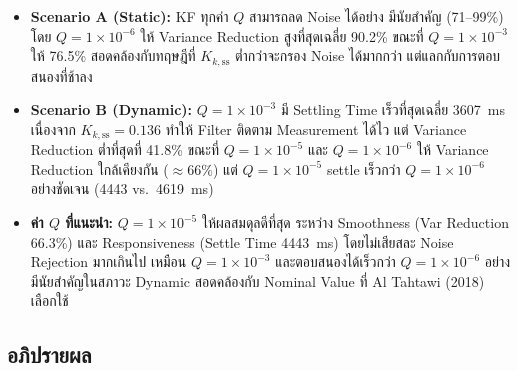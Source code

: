 \begin{itemize}
    \item \textbf{Scenario A (Static):} KF ทุกค่า $Q$ สามารถลด Noise ได้อย่าง
          มีนัยสำคัญ (71--99\%) โดย $Q = 1\times10^{-6}$ ให้ Variance Reduction
          สูงที่สุดเฉลี่ย 90.2\% ขณะที่ $Q = 1\times10^{-3}$ ให้ 76.5\%
          สอดคล้องกับทฤษฎีที่ $K_{k,\mathrm{ss}}$ ต่ำกว่าจะกรอง Noise ได้มากกว่า
          แต่แลกกับการตอบสนองที่ช้าลง

    \item \textbf{Scenario B (Dynamic):} $Q = 1\times10^{-3}$ มี Settling Time
          เร็วที่สุดเฉลี่ย 3607~ms เนื่องจาก $K_{k,\mathrm{ss}} = 0.136$
          ทำให้ Filter ติดตาม Measurement ได้ไว แต่ Variance Reduction
          ต่ำที่สุดที่ 41.8\% ขณะที่ $Q = 1\times10^{-5}$ และ $Q = 1\times10^{-6}$
          ให้ Variance Reduction ใกล้เคียงกัน ($\approx 66\%$) แต่ $Q = 1\times10^{-5}$
          settle เร็วกว่า $Q = 1\times10^{-6}$ อย่างชัดเจน (4443 vs.\ 4619~ms)

    \item \textbf{ค่า $Q$ ที่แนะนำ:} $Q = 1\times10^{-5}$ ให้ผลสมดุลดีที่สุด
          ระหว่าง Smoothness (Var Reduction 66.3\%) และ Responsiveness
          (Settle Time 4443~ms) โดยไม่เสียสละ Noise Rejection มากเกินไป
          เหมือน $Q = 1\times10^{-3}$ และตอบสนองได้เร็วกว่า $Q = 1\times10^{-6}$
          อย่างมีนัยสำคัญในสภาวะ Dynamic สอดคล้องกับ Nominal Value
          ที่ Al Tahtawi (2018) เลือกใช้
\end{itemize}

\subsection{อภิปรายผล}

